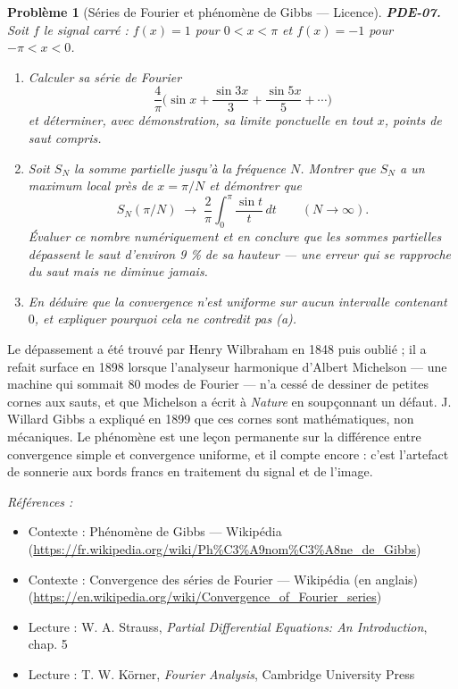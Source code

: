 \documentclass[11pt]{article}
\newtheorem{problem}{Problème}
\newenvironment{refs}{\par\small\noindent\emph{Références :}\begin{itemize}\setlength\itemsep{0pt}}{\end{itemize}\normalsize}
\begin{document}
\bigskip

\begin{problem}[{Séries de Fourier et phénomène de Gibbs --- Licence}]
\textbf{PDE-07.} Soit $f$ le signal carré : $f(x) = 1$ pour
$0 < x < \pi$ et $f(x) = -1$ pour $-\pi < x < 0$.
\begin{enumerate}
\item[(a)] Calculer sa
série de Fourier
\[ \frac{4}{\pi}\Big(\sin x + \frac{\sin 3x}{3} + \frac{\sin 5x}{5} + \cdots\Big) \]
et déterminer, avec démonstration, sa limite ponctuelle en tout $x$, points de saut
compris.
\item[(b)] Soit $S_N$ la somme partielle jusqu'à la fréquence $N$. Montrer que
$S_N$ a un maximum local près de $x = \pi/N$ et démontrer que
\[ S_N(\pi/N) \;\longrightarrow\; \frac{2}{\pi}\int_0^{\pi} \frac{\sin t}{t}\,dt
\qquad (N \to \infty). \]
Évaluer ce nombre numériquement et en conclure que les sommes partielles dépassent le saut
d'environ 9 \% de sa hauteur --- une erreur qui se rapproche du saut mais ne diminue jamais.
\item[(c)] En déduire que la convergence n'est uniforme sur aucun intervalle contenant
$0$, et expliquer pourquoi cela ne contredit pas (a).
\end{enumerate}

\end{problem}

\noindent Le dépassement a été trouvé par Henry Wilbraham en 1848 puis oublié ; il a
refait surface en 1898 lorsque l'analyseur harmonique d'Albert Michelson --- une machine qui
sommait 80 modes de Fourier --- n'a cessé de dessiner de petites cornes aux sauts, et que Michelson
a écrit à \textit{Nature} en soupçonnant un défaut. J. Willard Gibbs a expliqué en 1899 que ces
cornes sont mathématiques, non mécaniques. Le phénomène est une leçon permanente sur la différence
entre convergence simple et convergence uniforme, et il compte encore : c'est l'artefact de
sonnerie aux bords francs en traitement du signal et de l'image.

\begin{refs}
\item Contexte : Phénomène de Gibbs --- Wikipédia (\url{https://fr.wikipedia.org/wiki/Ph%C3%A9nom%C3%A8ne_de_Gibbs})
\item Contexte : Convergence des séries de Fourier --- Wikipédia (en anglais) (\url{https://en.wikipedia.org/wiki/Convergence_of_Fourier_series})
\item Lecture : W. A. Strauss, \textit{Partial Differential Equations: An Introduction}, chap. 5
\item Lecture : T. W. Körner, \textit{Fourier Analysis}, Cambridge University Press
\end{refs}
\end{document}
